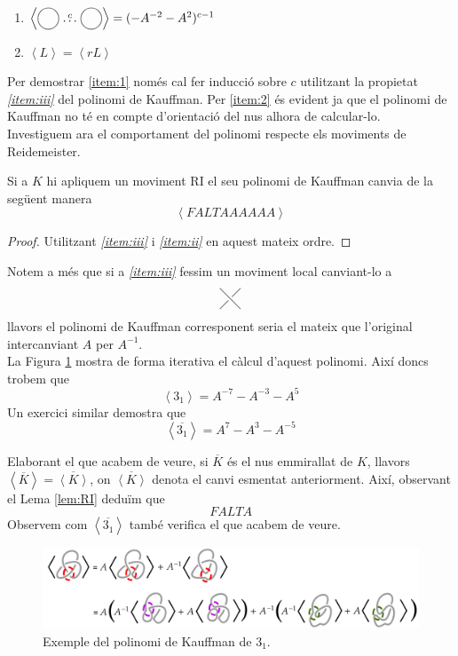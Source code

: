 \begin{enumerate}
	\item\label{item:1} $\left\langle\KPA\stackrel{c}{\dots}\KPA\right\rangle=(-A^{-2}-A^{2})^{c-1}$
	\item\label{item:2} $\left\langle L\right\rangle=\left\langle rL\right\rangle$
\end{enumerate}

Per demostrar \ref{item:1} només cal fer inducció sobre $c$ utilitzant la propietat \textit{\ref{item:iii}} del polinomi de Kauffman. Per \ref{item:2} és evident ja que el polinomi de Kauffman no té en compte d'orientació del nus alhora de calcular-lo.\\

Investiguem ara el comportament del polinomi respecte els moviments de Reidemeister.

\begin{lemma}\label{lem:RI}
	Si a $K$ hi apliquem un moviment RI el seu polinomi de Kauffman canvia de la següent manera $$\left\langle FALTAAAAAA\right\rangle$$
\end{lemma}

\begin{proof}
	Utilitzant \textit{\ref{item:iii}} i \textit{\ref{item:ii}} en aquest mateix ordre.
\end{proof}

Notem a més que si a \textit{\ref{item:iii}} fessim un moviment local canviant-lo a $$\KPI$$ llavors el polinomi de Kauffman corresponent seria el mateix que l'original intercanviant $A$ per $A^{-1}$.\\

La Figura \ref{fig:calculpolinomidekauffman} mostra de forma iterativa el càlcul d'aquest polinomi. Així doncs trobem que $$\left\langle 3_1\right\rangle=A^{-7}-A^{-3}-A^{5}$$ Un exercici similar demostra que $$\left\langle \overline{3_1}\right\rangle=A^{7}-A^{3}-A^{-5}$$

Elaborant el que acabem de veure, si $\overline{K}$ és el nus emmirallat de $K$, llavors $\left\langle\overline{K}\right\rangle=\overline{\left\langle K\right\rangle}$, on $\overline{\left\langle K\right\rangle}$ denota el canvi esmentat anteriorment. Així, observant el Lema \ref{lem:RI} deduïm que $$FALTA$$ Observem com $\left\langle\overline{3_1}\right\rangle$ també verifica el que acabem de veure.

\begin{figure}
	\centering
	\includegraphics[width=\linewidth]{img/polinomidekauffman.png}
	\caption{Exemple del polinomi de Kauffman de $3_1$.}\label{fig:calculpolinomidekauffman}
\end{figure}

